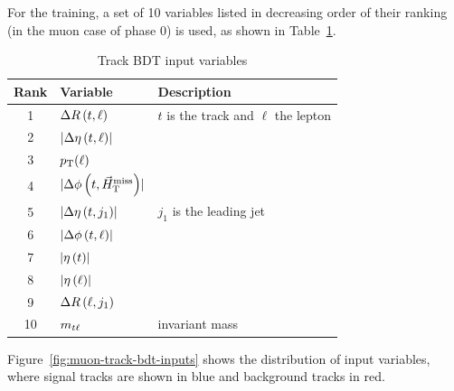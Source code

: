 For the training, a set of 10 variables listed in decreasing order of their ranking (in the muon case of phase 0) is used, as shown in Table~\ref{tab:track-bdt-variables}.

\begin{table}[!htb]
	\centering
	\label{tab:track-bdt-variables}
		\caption{Track BDT input variables}
			\begin{tabular}{cll} \hline
			Rank & Variable & Description \\ \hline
			1 & $\Delta R\left(t, \ell\right)$ & $t$ is the track and $\ell$ the lepton\\
			2 & $\lvert \Delta \eta \left(t, \ell\right)  \rvert$ & \\
			3 & $p_{\mathrm{T}}(\ell)$ & \\
			
			4 & $\lvert \Delta\phi\left(t, \vec{H}_{\text{T}}^{\text{miss}} \right) \rvert$ & \\
			5 & $\lvert \Delta\eta\left(t, j_1 \right) \rvert$ & $j_1$ is the leading jet\\
			6 & $\lvert \Delta\phi\left(t, \ell \right) \rvert$ & \\
			7 & $\lvert \eta\left(t\right) \rvert$ & \\
			8 & $\lvert \eta\left(\ell\right) \rvert$ & \\
			9 & $\Delta R\left(\ell, j_1\right)$ & \\
			10 & $m_{t\ell}$ & invariant mass \\ 
			\hline
			\end{tabular}
\end{table}

Figure~\ref{fig:muon-track-bdt-inputs} shows the distribution of input variables, where signal tracks are shown in blue and background tracks in red.

